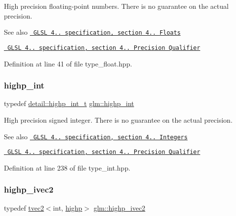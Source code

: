 High precision floating-\/point numbers. There is no guarantee on the actual precision.

\begin{DoxySeeAlso}{See also}
\href{http://www.opengl.org/registry/doc/GLSLangSpec.4.20.8.pdf}{\texttt{ G\+L\+SL 4.. specification, section 4.. Floats}} 

\href{http://www.opengl.org/registry/doc/GLSLangSpec.4.20.8.pdf}{\texttt{ G\+L\+SL 4.. specification, section 4.. Precision Qualifier}} 
\end{DoxySeeAlso}


Definition at line 41 of file type\+\_\+float.\+hpp.

\mbox{\label{group__core__precision_gaafed5240eb0a43328cb75faf5fb0a8c2}} 
\subsubsection{\texorpdfstring{highp\_int}{highp\_int}}
{\footnotesize\ttfamily typedef \mbox{\hyperlink{namespaceglm_1_1detail_a74c48e9deafcc33db998a4ee62da8d6e}{detail\+::highp\+\_\+int\+\_\+t}} \mbox{\hyperlink{group__core__precision_gaafed5240eb0a43328cb75faf5fb0a8c2}{glm\+::highp\+\_\+int}}}

High precision signed integer. There is no guarantee on the actual precision.

\begin{DoxySeeAlso}{See also}
\href{http://www.opengl.org/registry/doc/GLSLangSpec.4.20.8.pdf}{\texttt{ G\+L\+SL 4.. specification, section 4.. Integers}} 

\href{http://www.opengl.org/registry/doc/GLSLangSpec.4.20.8.pdf}{\texttt{ G\+L\+SL 4.. specification, section 4.. Precision Qualifier}} 
\end{DoxySeeAlso}


Definition at line 238 of file type\+\_\+int.\+hpp.

\mbox{\label{group__core__precision_ga01acd79fbbe3d93a532276586b5c39ee}} 
\subsubsection{\texorpdfstring{highp\_ivec2}{highp\_ivec2}}
{\footnotesize\ttfamily typedef \mbox{\hyperlink{structglm_1_1tvec2}{tvec2}}$<$int, \mbox{\hyperlink{namespaceglm_a0f04f086094c747d227af4425893f545ac6f7eab42eacbb10d59a58e95e362074}{highp}}$>$ \mbox{\hyperlink{group__core__precision_ga01acd79fbbe3d93a532276586b5c39ee}{glm\+::highp\+\_\+ivec2}}}

